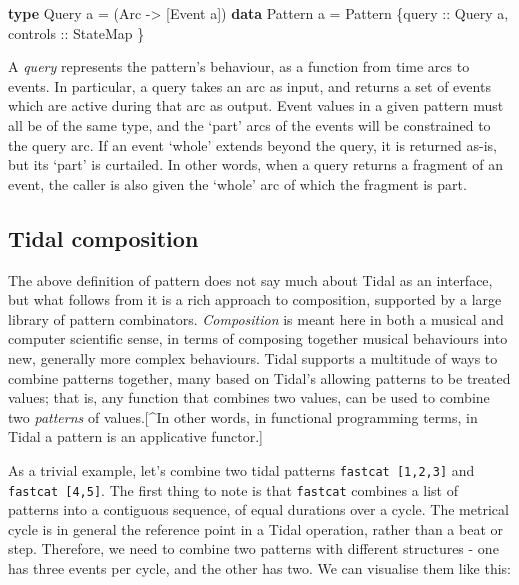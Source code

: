 \documentclass{nime-alternate} %
\newenvironment{Shaded}{\begin{snugshade}}{\end{snugshade}}
\newcommand{\DataTypeTok}[1]{\textcolor[rgb]{0.13,0.29,0.53}{#1}}
\newcommand{\KeywordTok}[1]{\textcolor[rgb]{0.13,0.29,0.53}{\textbf{#1}}}
\newcommand{\NormalTok}[1]{#1}
\newcommand{\OtherTok}[1]{\textcolor[rgb]{0.56,0.35,0.01}{#1}}
\begin{document}
\begin{Shaded}
\begin{Highlighting}[]
\KeywordTok{type} \DataTypeTok{Query}\NormalTok{ a }\OtherTok{=}\NormalTok{ (}\DataTypeTok{Arc} \OtherTok{{-}>}\NormalTok{ [}\DataTypeTok{Event}\NormalTok{ a])}
\KeywordTok{data} \DataTypeTok{Pattern}\NormalTok{ a }\OtherTok{=} \DataTypeTok{Pattern}\NormalTok{ \{}\OtherTok{query ::} \DataTypeTok{Query}\NormalTok{ a,}
\OtherTok{                          controls ::} \DataTypeTok{StateMap}
\NormalTok{\}}
\end{Highlighting}
\end{Shaded}

A \emph{query} represents the pattern's behaviour, as a function from
time arcs to events. In particular, a query takes an arc as input, and
returns a set of events which are active during that arc as output.
Event values in a given pattern must all be of the same type, and the
`part' arcs of the events will be constrained to the query arc. If an
event `whole' extends beyond the query, it is returned as-is, but its
`part' is curtailed. In other words, when a query returns a fragment of
an event, the caller is also given the `whole' arc of which the fragment
is part.

\hypertarget{tidal-composition}{%
\subsection{Tidal composition}\label{tidal-composition}}

The above definition of pattern does not say much about Tidal as an
interface, but what follows from it is a rich approach to composition,
supported by a large library of pattern combinators. \emph{Composition}
is meant here in both a musical and computer scientific sense, in terms
of composing together musical behaviours into new, generally more
complex behaviours. Tidal supports a multitude of ways to combine
patterns together, many based on Tidal's allowing patterns to be treated
values; that is, any function that combines two values, can be used to
combine two \emph{patterns} of values.{[}\^{}In other words, in
functional programming terms, in Tidal a pattern is an applicative
functor.{]}

As a trivial example, let's combine two tidal patterns
\texttt{fastcat\ {[}1,2,3{]}} and \texttt{fastcat\ {[}4,5{]}}. The first
thing to note is that \texttt{fastcat} combines a list of patterns into
a contiguous sequence, of equal durations over a cycle. The metrical
cycle is in general the reference point in a Tidal operation, rather
than a beat or step. Therefore, we need to combine two patterns with
different structures - one has three events per cycle, and the other has
two. We can visualise them like this:
\end{document}
